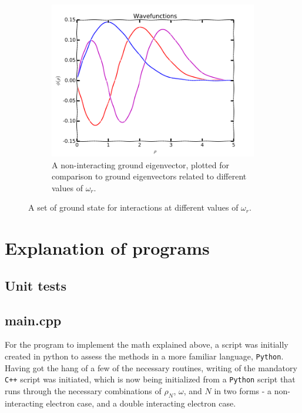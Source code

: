 \documentclass[11pt,a4paper,notitlepage]{article}
\begin{document}
\begin{figure}[H]
\begin{subfigure}[t]{0.45\textwidth}
		\includegraphics[scale=0.40]{../eigvecs_vs_each_other.png}
		\caption{A non-interacting ground eigenvector, plotted for comparison to ground eigenvectors related to different values of $\omega_r$.}\label{fig:ground-eigvecs-compare}
	\end{subfigure}
	\caption{A set of ground state for interactions at different values of $\omega_r$.}\label{fig:eigvecs-interact}
\end{figure}

\section{Explanation of programs}
\subsection{Unit tests} \label{sec:unit tests}

\subsection{main.cpp}
For the program to implement the math explained above, a script was initially created in python to assess the methods in a more familiar language, \verb|Python|. Having got the hang of a few of the necessary routines, writing of the mandatory \verb|C++| script was initiated, which is now being initialized from a \verb|Python| script that runs through the necessary combinations of $\rho_N$, $\omega$, and $N$ in two forms - a non-interacting electron case, and a double interacting electron case.
\end{document}

